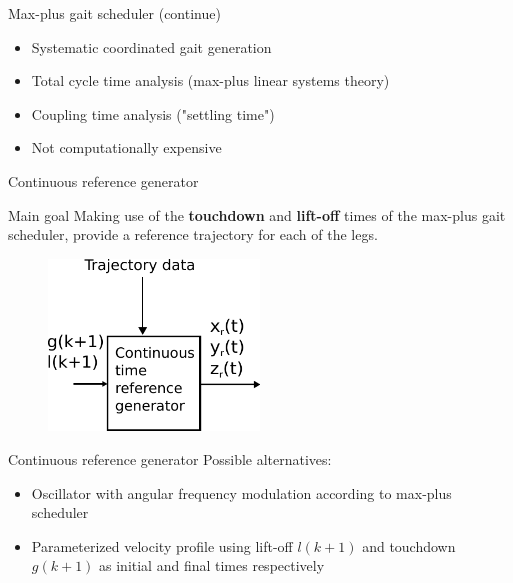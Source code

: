 \documentclass{beamer}
\begin{document}
\begin{frame}{Max-plus gait scheduler (continue)}
\begin{itemize}
	\setlength\itemsep{2em}
	\item Systematic coordinated gait generation 
	\item Total cycle time analysis (max-plus linear systems theory)
	\item Coupling time analysis ("settling time")
	\item Not computationally expensive
\end{itemize}	
\end{frame}

\begin{frame}{Continuous reference generator}
	\begin{block}{Main goal}
		\Large Making use of the \textbf{touchdown} and \textbf{lift-off} times of the max-plus gait scheduler, provide a reference trajectory for each of the legs.
	\end{block}
	\begin{figure}[H]
		\includegraphics[width=0.5\textwidth]{AngularFrequency.pdf}
	\end{figure}
\end{frame}

\begin{frame}{Continuous reference generator}
Possible alternatives:
\begin{itemize}\setlength\itemsep{2em}
	\item Oscillator with angular frequency modulation according to max-plus scheduler
	\item Parameterized velocity profile using lift-off $l(k+1)$ and touchdown $g(k+1)$ as initial and final times respectively
\end{itemize}
\end{frame}
\end{document}
